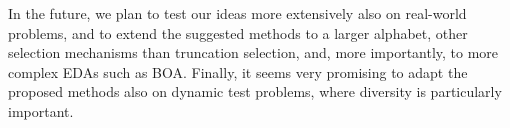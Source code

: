 \documentclass{acm_proc_article-sp}
\begin{document}
In the future, we plan to test our ideas more extensively also on real-world problems, and to extend the suggested methods to a larger alphabet, other selection mechanisms than truncation selection, and, more importantly, to more complex EDAs such as BOA.
Finally, it seems very promising to adapt the proposed methods also on dynamic
test problems, where diversity is particularly important.




\end{document}

